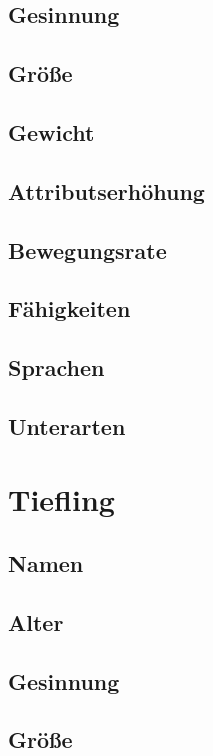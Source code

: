 \subsection*{Gesinnung}
\subsection*{Größe}
\subsection*{Gewicht}
\subsection*{Attributserhöhung}
\subsection*{Bewegungsrate}
\subsection*{Fähigkeiten}
\subsection*{Sprachen}
\subsection*{Unterarten}

%

\newpage
\section{Tiefling}

\subsection*{Namen}
\subsection*{Alter}
\subsection*{Gesinnung}
\subsection*{Größe}
